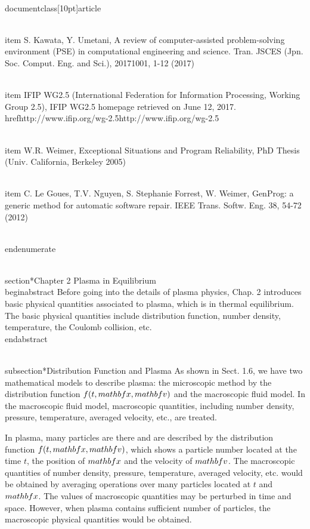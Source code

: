\\documentclass[10pt]{article}
\begin{document}
  \\item S. Kawata, Y. Umetani, A review of computer-assisted problem-solving environment (PSE) in computational engineering and science. Tran. JSCES (Jpn. Soc. Comput. Eng. and Sci.), 20171001, 1-12 (2017)

  \\item IFIP WG2.5 (International Federation for Information Processing, Working Group 2.5), IFIP WG2.5 homepage retrieved on June 12, 2017. \\href{http://www.ifip.org/wg-2.5}{http://www.ifip.org/wg-2.5}

  \\item W.R. Weimer, Exceptional Situations and Program Reliability, PhD Thesis (Univ. California, Berkeley 2005)

  \\item C. Le Goues, T.V. Nguyen, S. Stephanie Forrest, W. Weimer, GenProg: a generic method for automatic software repair. IEEE Trans. Softw. Eng. 38, 54-72 (2012)

\\end{enumerate}

\\section*{Chapter 2 Plasma in Equilibrium }
\\begin{abstract}
Before going into the details of plasma physics, Chap. 2 introduces basic physical quantities associated to plasma, which is in thermal equilibrium. The basic physical quantities include distribution function, number density, temperature, the Coulomb collision, etc.
\\end{abstract}

\\subsection*{Distribution Function and Plasma}
As shown in Sect. 1.6, we have two mathematical models to describe plasma: the microscopic method by the distribution function $f(t, \\mathbf{x}, \\mathbf{v})$ and the macroscopic fluid model. In the macroscopic fluid model, macroscopic quantities, including number density, pressure, temperature, averaged velocity, etc., are treated.

In plasma, many particles are there and are described by the distribution function $f(t, \\mathbf{x}, \\mathbf{v})$, which shows a particle number located at the time $t$, the position of $\\mathbf{x}$ and the velocity of $\\mathbf{v}$. The macroscopic quantities of number density, pressure, temperature, averaged velocity, etc. would be obtained by averaging operations over many particles located at $t$ and $\\mathbf{x}$. The values of macroscopic quantities may be perturbed in time and space. However, when plasma contains sufficient number of particles, the macroscopic physical quantities would be obtained.
\end{document}
